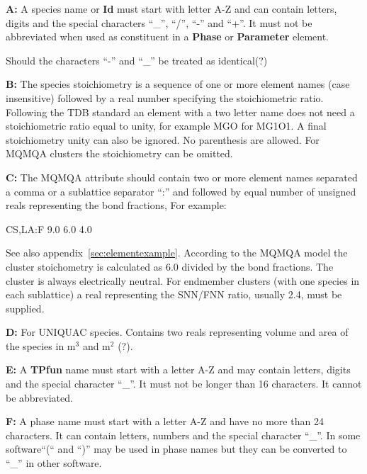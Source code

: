 \documentclass{article}
\begin{document}
\begin{description}
\item{\bf A:}\label{sec:noteA} A species name or {\bf Id} must start
  with letter A-Z and can contain letters, digits and the special
  characters ``\_'', ``/'', ``-'' and ``+''.  It must not be
  abbreviated when used as constituent in a {\bf Phase} or {\bf
    Parameter} element.

  Should the characters ``-'' and ``\_'' be treated as identical(?)

\item{\bf B:} The species stoichiometry is a sequence of one or more
  element names (case insensitive) followed by a real number
  specifying the stoichiometric ratio.  Following the TDB standard an
  element with a two letter name does not need a stoichiometric ratio
  equal to unity, for example MGO for MG1O1.  A final stoichiometry
  unity can also be ignored.  No parenthesis are allowed.  For MQMQA
  clusters the stoichiometry can be omitted.

\item{\bf C:} The MQMQA attribute should contain two or more element
  names separated a comma or a sublattice separator ``:'' and
  followed by equal number of unsigned reals representing the bond
  fractions, For example:

  CS,LA:F  9.0 6.0 4.0

  See also appendix~\ref{sec:elementexample}.  According to the MQMQA
  model the cluster stoichometry is calculated as 6.0 divided by the
  bond fractions.  The cluster is always electrically neutral.  For
  endmember clusters (with one species in each sublattice) a real
  representing the SNN/FNN ratio, usually 2.4, must be supplied.

\item{\bf D:} For UNIQUAC species.  Contains two reals representing
  volume and area of the species in m$^3$ and m$^2$ (?).

\item{\bf E:} A {\bf TPfun} name must start with a letter A-Z and may
  contain letters, digits and the special character ``\_''.  It must
  not be longer than 16 characters.  It cannot be abbreviated.


  \newpage
  
\item{\bf F:} A phase name must start with a letter A-Z and have no
  more than 24 characters.  It can contain letters, numbers and the
  special character ``\_''.  In some software``(`` and ``)'' may be
  used in phase names but they can be converted to ``\_'' in other
  software.


\end{description}
\end{document}

